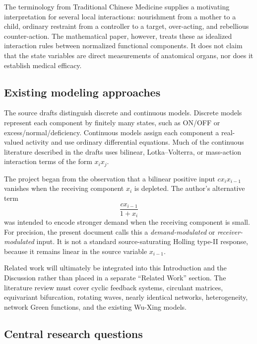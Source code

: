\documentclass[11pt, reqno]{amsart}
\theoremstyle{definition}
\theoremstyle{remark}
\begin{document}
The terminology from Traditional Chinese Medicine supplies a motivating
interpretation for several local interactions: nourishment from a mother to a
child, ordinary restraint from a controller to a target, over-acting, and
rebellious counter-action.  The mathematical paper, however, treats these as
idealized interaction rules between normalized functional components.  It does
not claim that the state variables are direct measurements of anatomical
organs, nor does it establish medical efficacy.

\subsection{Existing modeling approaches}

The source drafts distinguish discrete and continuous models.  Discrete models
represent each component by finitely many states, such as ON/OFF or
excess/normal/deficiency.  Continuous models assign each component a
real-valued activity and use ordinary differential equations.  Much of the
continuous literature described in the drafts uses bilinear, Lotka--Volterra,
or mass-action interaction terms of the form $x_i x_j$.

The project began from the observation that a bilinear positive input
$c x_i x_{i-1}$ vanishes when the receiving component $x_i$ is depleted.  The
author's alternative term
\[
    \frac{c x_{i-1}}{1+x_i}
\]
was intended to encode stronger demand when the receiving component is small.
For precision, the present document calls this a \emph{demand-modulated} or
\emph{receiver-modulated} input.  It is not a standard source-saturating
Holling type-II response, because it remains linear in the source variable
$x_{i-1}$.

Related work will ultimately be integrated into this Introduction and the
Discussion rather than placed in a separate ``Related Work'' section.  The
literature review must cover cyclic feedback systems, circulant matrices,
equivariant bifurcation, rotating waves, nearly identical networks,
heterogeneity, network Green functions, and the existing Wu-Xing models.


\subsection{Central research questions}
\end{document}

